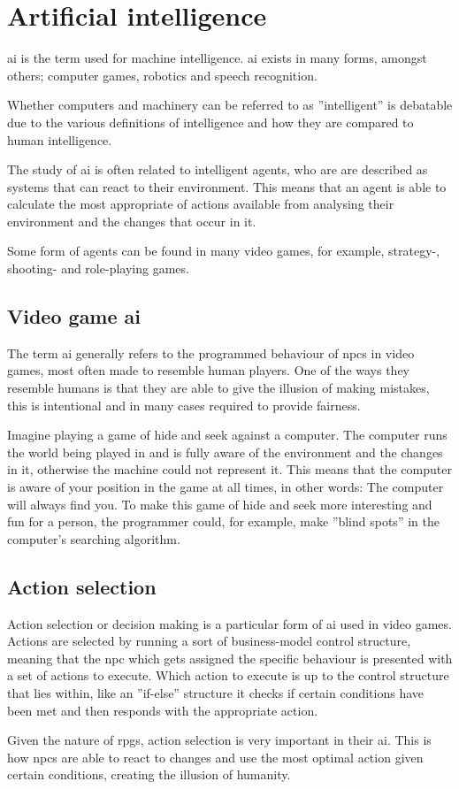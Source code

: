 \section{Artificial intelligence}
\ac{ai} is the term used for machine intelligence. \ac{ai} exists in many forms, amongst others; computer games, robotics and speech recognition.

Whether computers and machinery can be referred to as ''intelligent'' is debatable due to the various definitions of intelligence and how they are compared to human intelligence.

The study of \ac{ai} is often related to intelligent agents, who are are described as systems that can react to their environment. This means that an agent is able to calculate the most appropriate of actions available from analysing their environment and the changes that occur in it.

Some form of agents can be found in many video games, for example, strategy-, shooting- and role-playing games.\cite{artint}

\subsection{Video game \ac{ai}}
The term \ac{ai} generally refers to the programmed behaviour of \ac{npc}s in video games, most often made to resemble human players. One of the ways they resemble humans is that they are able to give the illusion of making mistakes, this is intentional and in many cases required to provide fairness.

Imagine playing a game of hide and seek against a computer. The computer runs the world being played in and is fully aware of the environment and the changes in it, otherwise the machine could not represent it. This means that the computer is aware of your position in the game at all times, in other words: The computer will always find you. To make this game of hide and seek more interesting and fun for a person, the programmer could, for example, make ''blind spots'' in the computer's searching algorithm.\cite{videoint}

\subsection{Action selection}
\label{analysis:action}
Action selection or decision making is a particular form of \ac{ai} used in video games. Actions are selected by running a sort of business-model control structure, meaning that the \ac{npc} which gets assigned the specific behaviour is presented with a set of actions to execute. Which action to execute is up to the control structure that lies within, like an ''if-else'' structure it checks if certain conditions have been met and then responds with the appropriate action.\cite{actionselect}

Given the nature of \ac{rpgs}, action selection is very important in their \ac{ai}. This is how \ac{npc}s are able to react to changes and use the most optimal action given certain conditions, creating the illusion of humanity.
